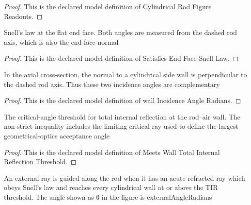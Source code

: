 \begin{proof}
  This is the declared model definition of Cylindrical Rod Figure Readouts.
\end{proof}
\begin{definition}
  \label{def:physics:phyx-mini-0010:phyxminiproblems-problemphyxmini0010-satisfiesendfacesnelllaw}
  Snell's law at the flat end face. Both angles are measured from the dashed rod axis, which is also the end-face normal
\end{definition}
\begin{proof}
  This is the declared model definition of Satisfies End Face Snell Law.
\end{proof}
\begin{definition}
  \label{def:physics:phyx-mini-0010:phyxminiproblems-problemphyxmini0010-wallincidenceangleradians}
  In the axial cross-section, the normal to a cylindrical side wall is perpendicular to the dashed rod axis. Thus these two incidence angles are complementary
\end{definition}
\begin{proof}
  This is the declared model definition of wall Incidence Angle Radians.
\end{proof}
\begin{definition}
  \label{def:physics:phyx-mini-0010:phyxminiproblems-problemphyxmini0010-meetswalltotalinternalreflectionthreshold}
  The critical-angle threshold for total internal reflection at the rod--air wall. The non-strict inequality includes the limiting critical ray used to define the largest geometrical-optics acceptance angle
\end{definition}
\begin{proof}
  This is the declared model definition of Meets Wall Total Internal Reflection Threshold.
\end{proof}
\begin{definition}
  \label{def:physics:phyx-mini-0010:phyxminiproblems-problemphyxmini0010-canbeguidedbytotalinternalreflection}
  An external ray is guided along the rod when it has an acute refracted ray which obeys Snell's law and reaches every cylindrical wall at or above the TIR threshold. The angle shown as θ in the figure is externalAngleRadians
\end{definition}
